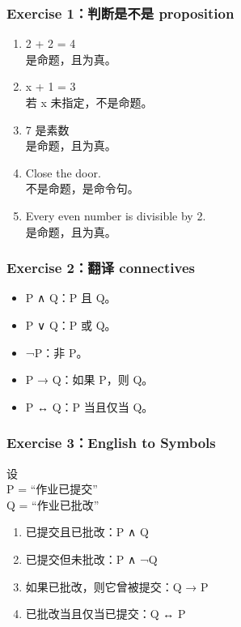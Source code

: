\documentclass[
  11pt,
]{article}
\providecommand{\tightlist}{%
  \setlength{\itemsep}{0pt}\setlength{\parskip}{0pt}}
\begin{document}
\subsubsection{Exercise 1：判断是不是
proposition}\label{exercise-1ux5224ux65adux662fux4e0dux662f-proposition}

\begin{enumerate}
\def\labelenumi{\arabic{enumi}.}
\tightlist
\item
  2 + 2 = 4\\
  是命题，且为真。
\item
  x + 1 = 3\\
  若 x 未指定，不是命题。
\item
  7 是素数\\
  是命题，且为真。
\item
  Close the door.\\
  不是命题，是命令句。
\item
  Every even number is divisible by 2.\\
  是命题，且为真。
\end{enumerate}

\subsubsection{Exercise 2：翻译
connectives}\label{exercise-2ux7ffbux8bd1-connectives}

\begin{itemize}
\tightlist
\item
  P ∧ Q：P 且 Q。
\item
  P ∨ Q：P 或 Q。
\item
  ¬P：非 P。
\item
  P → Q：如果 P，则 Q。
\item
  P ↔ Q：P 当且仅当 Q。
\end{itemize}

\subsubsection{Exercise 3：English to
Symbols}\label{exercise-3english-to-symbols}

设\\
P = ``作业已提交''\\
Q = ``作业已批改''

\begin{enumerate}
\def\labelenumi{\arabic{enumi}.}
\tightlist
\item
  已提交且已批改：P ∧ Q\\
\item
  已提交但未批改：P ∧ ¬Q\\
\item
  如果已批改，则它曾被提交：Q → P\\
\item
  已批改当且仅当已提交：Q ↔ P
\end{enumerate}
\end{document}
